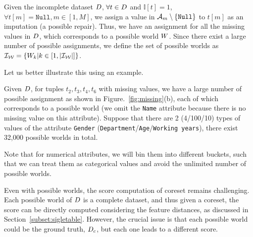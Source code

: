 
 Given   the incomplete dataset $D$, $\forall t \in D$ and $\mathbb{I}[t] = 1$, $ \forall t[m] = \texttt{Null}, m \in[1, M]$, we assign a value in $\mathcal{A}_m\setminus \{ \texttt{Null}\}$ to $t[m]$ as an imputation (\aka a possible repair). Thus, we have an assignment for all the missing values in $D$, which corresponds to a possible world $W$. Since there exist a large number of possible assignments,
 we define the set of possible worlds as $\mathcal{I_W}=\{W_k| k\in [1,|\mathcal{I_W}|] \}$.
 
 Let us better illustrate this using an example.
	

\begin{example}
	
Given $D$, for tuples $t_2, t_3, t_4, t_6$ with missing values, we have a large number of possible assignment  as shown in Figure.~\ref{fig:missing}(b), each of which corresponds to a possible world (we omit the \texttt{Name} attribute because there is no missing value on this attribute). Suppose that there are 2 (4/100/10) types of values of the attribute \texttt{Gender} (\texttt{Department}/\texttt{Age}/\texttt{Working years}), there exist 32,000 possible worlds in total. %
\vspace{-0.3em}
\end{example}

Note that for numerical attributes, we will bin them into different buckets, such that we can treat them as categorical values and avoid the unlimited number of possible worlds.

Even with  possible worlds, the score computation of coreset remains challenging. 
Each possible world of $D$ is a complete dataset, and thus given a coreset, the score can be directly computed considering the feature distances, as discussed in Section~\ref{subset:sigletable}. However, the crucial issue is that each possible world could be the ground truth, \ie $D_c$, but each one leads to a different score.
%

